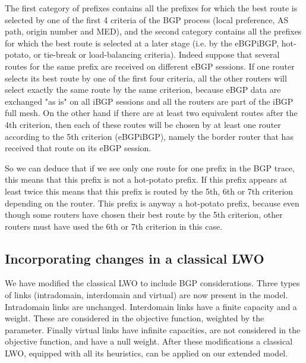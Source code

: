 \documentclass{acm_proc_article-sp}
\begin{document}
The first category of prefixes contains all the prefixes
for which the best route is selected by one of the first 4 criteria
of the BGP process (local preference, AS path, origin
number and MED), 
and the second category contains all the prefixes for
which the best route is selected at a later stage (i.e. by the eBGPiBGP, hot-potato, or tie-break
or load-balancing criteria). Indeed suppose that several routes for the same
prefix are received on different eBGP sessions. If one router selects its best
route by one of the first four criteria, all the other routers will select exactly the
same route by the same criterion, because eBGP data are exchanged "as is" 
on all iBGP sessions and all the routers are part of the iBGP
full mesh. On the other hand if there are at least two equivalent routes 
after the 4th criterion, then each of these routes will be chosen by at least one router 
according to the 5th criterion (eBGPiBGP), namely the border router that has
received that route on its eBGP session.

So we can deduce that if we see only one route for one prefix in the BGP trace,
this means that this prefix is not a hot-potato prefix. 
If this prefix appears at least twice this
means that this prefix is routed by the 5th, 6th or 7th criterion
depending on the router. This prefix is anyway a hot-potato prefix, because
even though some routers have chosen their best route by the 5th criterion,
other routers must have used the 6th or 7th criterion in this case.

\subsection{Incorporating changes in a classical LWO}

We have modified the classical LWO to 
include BGP considerations. Three types of links
(intradomain, interdomain and virtual) are now present in the model. 
Intradomain links are unchanged. Interdomain links have a finite capacity and a weight. 
These are considered in the objective function, weighted by the 
parameter.
Finally virtual links have infinite capacities, are not considered in 
the objective function, and have a null weight. 
After these modifications a classical LWO, equipped with all its heuristics, 
can be applied on our extended model.
\end{document}
